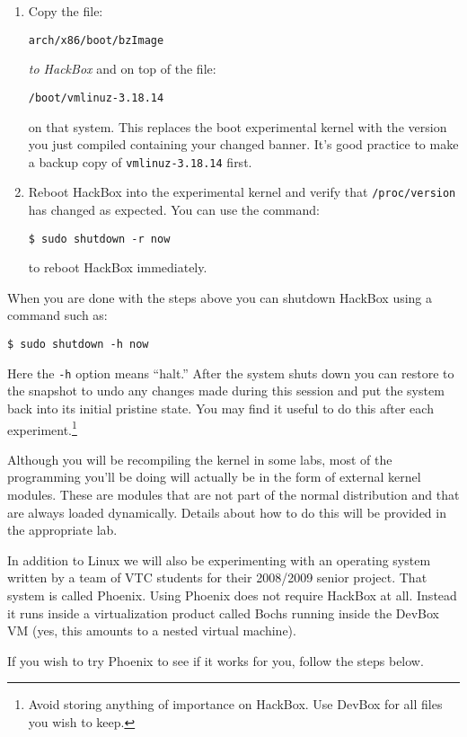 \documentclass[twocolumn]{article}
\begin{document}
\begin{enumerate}
\item Copy the file:
\begin{Verbatim}
arch/x86/boot/bzImage
\end{Verbatim}
  \emph{to HackBox} and on top of the file:
\begin{Verbatim}
/boot/vmlinuz-3.18.14
\end{Verbatim}
  on that system. This replaces the boot experimental kernel with the version you just compiled
  containing your changed banner. It's good practice to make a backup copy of
  \texttt{vmlinuz-3.18.14} first.

\item Reboot HackBox into the experimental kernel and verify that \texttt{/proc/version} has
  changed as expected. You can use the command:
\begin{Verbatim}
$ sudo shutdown -r now
\end{Verbatim}
  to reboot HackBox immediately.

\end{enumerate}

When you are done with the steps above you can shutdown HackBox using a command such as:
\begin{Verbatim}
$ sudo shutdown -h now
\end{Verbatim}
Here the \texttt{-h} option means ``halt.'' After the system shuts down you can restore to the
snapshot to undo any changes made during this session and put the system back into its initial
pristine state. You may find it useful to do this after each experiment.\footnote{Avoid storing
  anything of importance on HackBox. Use DevBox for all files you wish to keep.}

Although you will be recompiling the kernel in some labs, most of the programming you'll be
doing will actually be in the form of external kernel modules. These are modules that are not
part of the normal distribution and that are always loaded dynamically. Details about how to do
this will be provided in the appropriate lab.

In addition to Linux we will also be experimenting with an operating system written by a team of
VTC students for their 2008/2009 senior project. That system is called Phoenix. Using Phoenix
does not require HackBox at all. Instead it runs inside a virtualization product called Bochs
running inside the DevBox VM (yes, this amounts to a nested virtual machine).

If you wish to try Phoenix to see if it works for you, follow the steps below.
\end{document}
